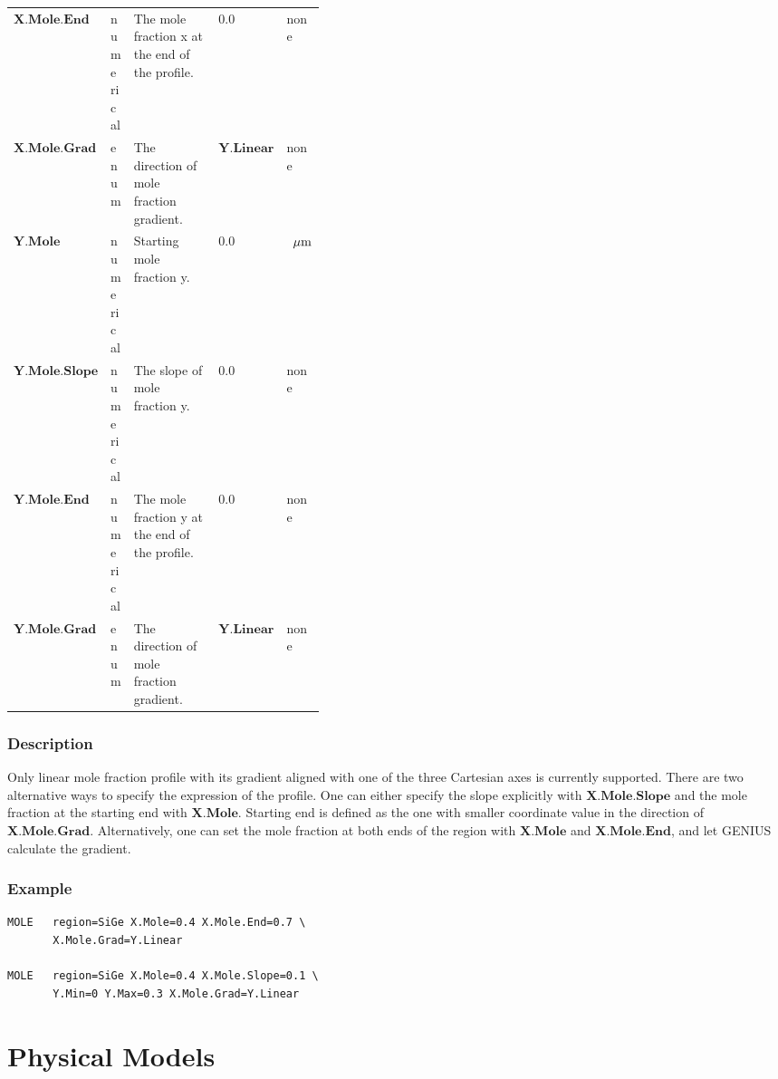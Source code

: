 \documentclass[oneside,12pt]{cgd_book}
\begin{document}
\begin{longtable}{ll>{\raggedright}p{0.4\linewidth}ll}
\\
 $\mathbf{X.Mole.End}$
& numerical
& The mole fraction x at the end of the profile.
& 0.0
& none
\\
 $\mathbf{X.Mole.Grad}$
& enum
& The direction of mole fraction gradient.
& $\mathbf{Y.Linear}$
& none
\\
 $\mathbf{Y.Mole}$
& numerical
& Starting mole fraction y.
& 0.0
& $\,~\mu \rm m$
\\
 $\mathbf{Y.Mole.Slope}$
& numerical
& The slope of mole fraction y.
& 0.0
& none
\\
 $\mathbf{Y.Mole.End}$
& numerical
& The mole fraction y at the end of the profile.
& 0.0
& none
\\
 $\mathbf{Y.Mole.Grad}$
& enum
& The direction of mole fraction gradient.
& $\mathbf{Y.Linear}$
& none\\
\end{longtable}

\par
\subsubsection{Description}
Only linear mole fraction profile with its gradient aligned with one of the three Cartesian axes is
          currently supported. There are two alternative ways to specify the expression of the profile. One can either
          specify the slope explicitly with $\mathbf{X.Mole.Slope}$
and the mole fraction at the starting
          end with $\mathbf{X.Mole}$. Starting end is defined as the one with smaller coordinate value in
          the direction of $\mathbf{X.Mole.Grad}$. Alternatively, one can set the mole fraction at both ends
          of the region with $\mathbf{X.Mole}$ and $\mathbf{X.Mole.End}$, and let GENIUS
          calculate the gradient.
\par
\subsubsection{Example}
\begin{lstlisting}[style=GeniusCode]
MOLE   region=SiGe X.Mole=0.4 X.Mole.End=0.7 \
       X.Mole.Grad=Y.Linear

MOLE   region=SiGe X.Mole=0.4 X.Mole.Slope=0.1 \
       Y.Min=0 Y.Max=0.3 X.Mole.Grad=Y.Linear
\end{lstlisting}
\section{Physical Models}
\end{document}
